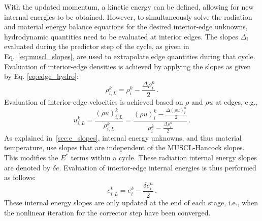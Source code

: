 \documentclass[preprint,12pt]{elsarticle}
\newcommand{\pep}{\, .}
\newcommand{\iL}{_{i,L}}
\begin{document}
With the updated momentum, a kinetic energy can be defined, allowing for new internal
energies to be obtained.  However, to simultaneously solve the radiation and material
energy balance equations for the desired interior-edge unknowns,
hydrodynamic quantities need to be evaluated at interior edges. The slopes $\Delta_i$
evaluated during the predictor step of the cycle, as given in Eq.~\eqref{eq:muscl_slopes}, are used
to extrapolate edge quantities during that cycle.  Evaluation of interior-edge
densities is achieved by applying the slopes as given by Eq. \eqref{eq:edge_hydro}:
\begin{equation}
   \rho\iL^k = \rho_i^k - \frac{\Delta\rho_i^n}{2} \pep
\end{equation}
Evaluation of interior-edge velocities is
achieved based on $\rho$ and $\rho u$ at edges, e.g.,
\begin{equation}
   u\iL^k = \frac{(\rho u)\iL^k}{\rho\iL^k}
          = \frac{(\rho u)_i^k - \frac{\Delta(\rho u)_i^n}{2}}
                 {\rho_i^k - \frac{\Delta\rho_i^n}{2}} \pep
\end{equation}
As explained in~\ref{sec:e_slopes}, internal energy unknowns, and thus material
temperature, use slopes that are independent of the MUSCL-Hancock slopes.  This modifies
the $E^*$ terms within a cycle.
These radiation internal energy slopes are denoted by $\delta e$. Evaluation
of interior-edge internal energies is thus performed as follows:
\begin{equation}
   e\iL^k = e_i^k - \frac{\delta e_i^n}{2} \pep
\end{equation}
 These internal energy slopes are only updated at the end of each stage, i.e.,
when the nonlinear iteration for the corrector step have been converged.
\end{document}

